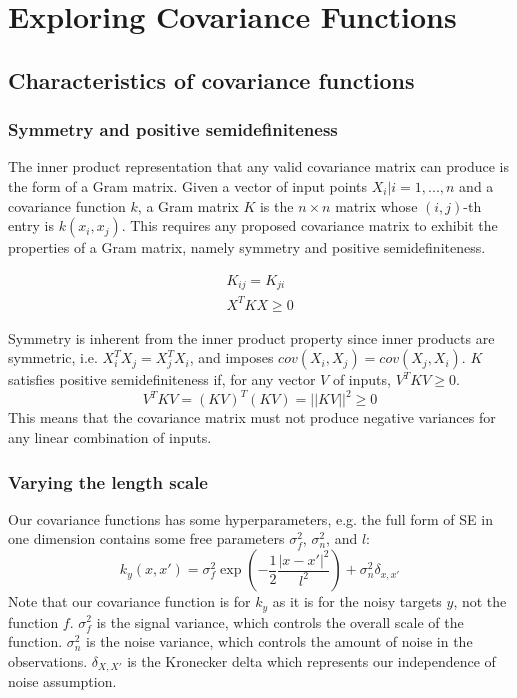 \section{Exploring Covariance Functions}


\subsection{Characteristics of covariance functions \cite{gp-ml}}


\subsubsection{Symmetry and positive semidefiniteness}
The inner product representation that any valid covariance matrix can produce is the form of a Gram matrix. Given a vector of input points ${X_i | i = 1, ..., n}$ and a covariance function $k$, a Gram matrix $K$ is the $n \times n$ matrix whose $(i,j)$-th entry is $k(x_i, x_j)$. This requires any proposed covariance matrix to exhibit the properties of a Gram matrix, namely symmetry and positive semidefiniteness.

\begin{equation*}
    \begin{aligned}
        K_{ij} = K_{ji} \\
        X^T K X \geq 0
    \end{aligned}
\end{equation*}

Symmetry is inherent from the inner product property since inner products are symmetric, i.e. $X_i^T X_j = X_j^T X_i$, and imposes $cov(X_i, X_j) = cov(X_j, X_i)$. $K$ satisfies positive semidefiniteness if, for any vector $V$ of inputs, $V^T K V \geq 0$. 
\begin{equation*}
    V^T K V = (K V)^T (K V) = ||K V||^2 \geq 0
\end{equation*}
This means that the covariance matrix must not produce negative variances for any linear combination of inputs.

\subsubsection{Varying the length scale}
Our covariance functions has some hyperparameters, e.g. the full form of SE in one dimension contains some free parameters $\sigma^2_f$, $\sigma^2_n$, and $l$:
\begin{equation*}
    k_y(x,x') = \sigma^2_f \exp\left(-\frac{1}{2}\frac{|x - x'|^2}{l^2}\right) + \sigma^2_n\delta_{x,x'}
\end{equation*}
Note that our covariance function is for $k_y$ as it is for the noisy targets $y$, not the function $f$. $\sigma^2_f$ is the signal variance, which controls the overall scale of the function. $\sigma^2_n$ is the noise variance, which controls the amount of noise in the observations. $\delta_{X,X'}$ is the Kronecker delta which represents our independence of noise assumption.

